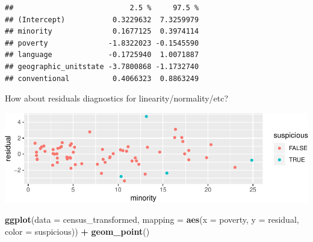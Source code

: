 \documentclass[landscape]{article}
\newenvironment{Shaded}{\begin{snugshade}}{\end{snugshade}}
\newcommand{\KeywordTok}[1]{\textcolor[rgb]{0.13,0.29,0.53}{\textbf{#1}}}
\newcommand{\DataTypeTok}[1]{\textcolor[rgb]{0.13,0.29,0.53}{#1}}
\newcommand{\StringTok}[1]{\textcolor[rgb]{0.31,0.60,0.02}{#1}}
\newcommand{\OperatorTok}[1]{\textcolor[rgb]{0.81,0.36,0.00}{\textbf{#1}}}
\newcommand{\NormalTok}[1]{#1}
\begin{document}
\begin{verbatim}
##                           2.5 %     97.5 %
## (Intercept)           0.3229632  7.3259979
## minority              0.1677125  0.3974114
## poverty              -1.8322023 -0.1545590
## language             -0.1725940  1.0071887
## geographic_unitstate -3.7800868 -1.1732740
## conventional          0.4066323  0.8863249
\end{verbatim}

How about residuals diagnostics for linearity/normality/etc?

\begin{Shaded}
\end{Shaded}

\includegraphics{20190422_multicollinearity_files/figure-latex/unnamed-chunk-22-1.pdf}

\begin{Shaded}
\begin{Highlighting}[]
\KeywordTok{ggplot}\NormalTok{(}\DataTypeTok{data =}\NormalTok{ census_transformed, }\DataTypeTok{mapping =} \KeywordTok{aes}\NormalTok{(}\DataTypeTok{x =}\NormalTok{ poverty, }\DataTypeTok{y =}\NormalTok{ residual, }\DataTypeTok{color =}\NormalTok{ suspicious)) }\OperatorTok{+}
\StringTok{  }\KeywordTok{geom_point}\NormalTok{()}
\end{Highlighting}
\end{Shaded}
\end{document}
